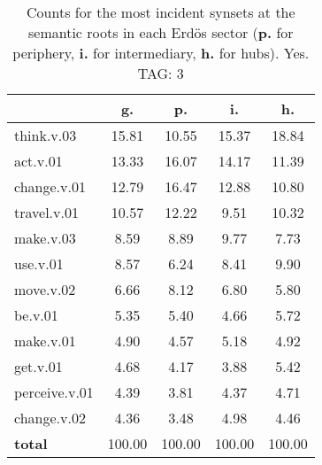 \begin{table}[h!]
\begin{center}
\begin{tabular}{| l || c | c | c | c |}\hline
 & {\bf g.} & {\bf p.} & {\bf i.} & {\bf h.} \\\hline\hline
think.v.03 & 15.81  & 10.55  & 15.37  & 18.84 \\\hline
act.v.01 & 13.33  & 16.07  & 14.17  & 11.39 \\\hline
change.v.01 & 12.79  & 16.47  & 12.88  & 10.80 \\\hline
travel.v.01 & 10.57  & 12.22  & 9.51  & 10.32 \\\hline
make.v.03 & 8.59  & 8.89  & 9.77  & 7.73 \\\hline
use.v.01 & 8.57  & 6.24  & 8.41  & 9.90 \\\hline
move.v.02 & 6.66  & 8.12  & 6.80  & 5.80 \\\hline
be.v.01 & 5.35  & 5.40  & 4.66  & 5.72 \\\hline
make.v.01 & 4.90  & 4.57  & 5.18  & 4.92 \\\hline
get.v.01 & 4.68  & 4.17  & 3.88  & 5.42 \\\hline
perceive.v.01 & 4.39  & 3.81  & 4.37  & 4.71 \\\hline
change.v.02 & 4.36  & 3.48  & 4.98  & 4.46 \\\hline\hline
{{\bf total}} & 100.00  & 100.00  & 100.00  & 100.00 \\\hline
\end{tabular}
\caption{Counts for the most incident synsets at the semantic roots in each Erd\"os sector ({\bf p.} for periphery, {\bf i.} for intermediary, {\bf h.} for hubs). Yes. TAG: 3}
\end{center}
\end{table}
